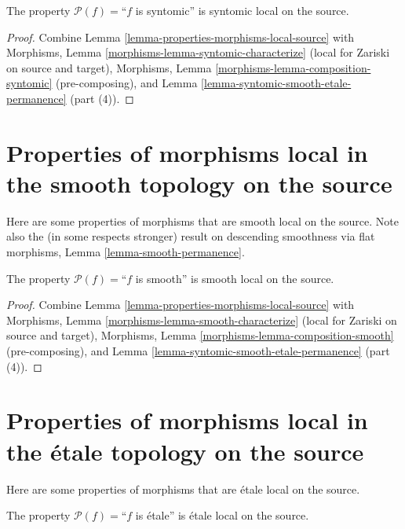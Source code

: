 \begin{lemma}
\label{lemma-syntomic-syntomic-local-source}
The property $\mathcal{P}(f)=$``$f$ is syntomic''
is syntomic local on the source.
\end{lemma}

\begin{proof}
Combine Lemma \ref{lemma-properties-morphisms-local-source} with
Morphisms, Lemma \ref{morphisms-lemma-syntomic-characterize}
(local for Zariski on source and target),
Morphisms, Lemma \ref{morphisms-lemma-composition-syntomic} (pre-composing),
and Lemma \ref{lemma-syntomic-smooth-etale-permanence} (part (4)).
\end{proof}




\section{Properties of morphisms local in the smooth topology on the source}
\label{section-smooth-local-source}

\noindent
Here are some properties of morphisms that are smooth local on the source.
Note also the (in some respects stronger) result
on descending smoothness via flat morphisms,
Lemma \ref{lemma-smooth-permanence}.

\begin{lemma}
\label{lemma-smooth-smooth-local-source}
The property $\mathcal{P}(f)=$``$f$ is smooth''
is smooth local on the source.
\end{lemma}

\begin{proof}
Combine Lemma \ref{lemma-properties-morphisms-local-source} with
Morphisms, Lemma \ref{morphisms-lemma-smooth-characterize}
(local for Zariski on source and target),
Morphisms, Lemma \ref{morphisms-lemma-composition-smooth} (pre-composing), and
Lemma \ref{lemma-syntomic-smooth-etale-permanence} (part (4)).
\end{proof}



\section{Properties of morphisms local in the \'etale topology on the source}
\label{section-etale-local-source}

\noindent
Here are some properties of morphisms that are \'etale local on the source.

\begin{lemma}
\label{lemma-etale-etale-local-source}
The property $\mathcal{P}(f)=$``$f$ is \'etale''
is \'etale local on the source.
\end{lemma}

